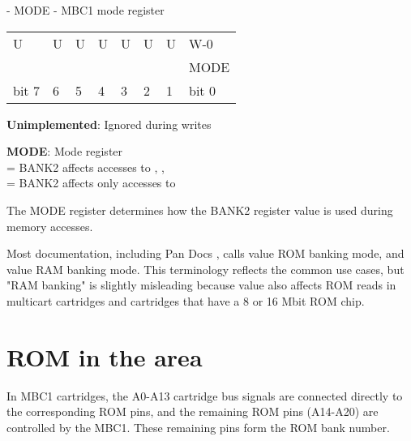 \begin{register}
  \caption{ - MODE - MBC1 mode register}

  \begin{tabu} to \textwidth {|X[c]|X[c]|X[c]|X[c]|X[c]|X[c]|X[c]|X[c]|}
    \everyrow{\hline}
    \hline
    U                     & U                     & U                     & U                           & U & U & U & W-0   \\
     &  &  &  &  &  &  & MODE \\
    \rowfont{\small}
    bit 7                 & 6                     & 5                     & 4                              & 3   & 2   & 1   & bit 0
  \end{tabu}

  \begin{description}[leftmargin=5em, style=nextline]
    \item[bit 7-1]
      \textbf{Unimplemented}: Ignored during writes
    \item[bit 0]
      \textbf{MODE}: Mode register \\
      = BANK2 affects accesses to , ,  \\
      = BANK2 affects only accesses to  \\
  \end{description}
\end{register}

The MODE register determines how the BANK2 register value is used during memory
accesses.

\begin{warning}
  Most documentation, including Pan Docs \cite{pandocs}, calls value 
  ROM banking mode, and value  RAM banking mode. This terminology
  reflects the common use cases, but "RAM banking" is slightly misleading because
  value  also affects ROM reads in multicart cartridges and cartridges
  that have a 8 or 16 Mbit ROM chip.
\end{warning}

\section{ROM in the  area}

In MBC1 cartridges, the A0-A13 cartridge bus signals are connected directly to
the corresponding ROM pins, and the remaining ROM pins (A14-A20) are controlled
by the MBC1. These remaining pins form the ROM bank number.

